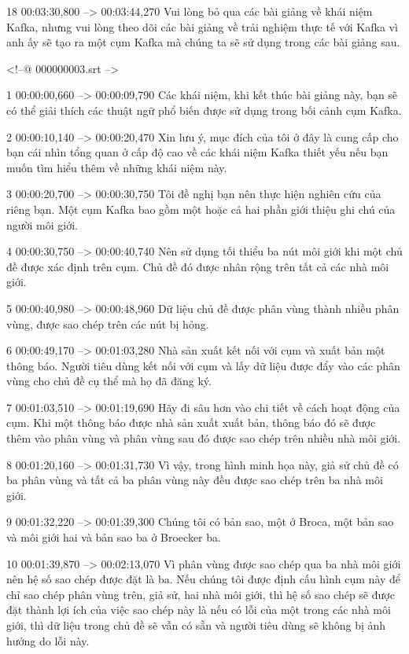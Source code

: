 18
00:03:30,800 --> 00:03:44,270
Vui lòng bỏ qua các bài giảng về khái niệm Kafka, nhưng vui lòng theo dõi các bài giảng về trải nghiệm thực tế với Kafka vì anh ấy sẽ tạo ra một cụm Kafka mà chúng ta sẽ sử dụng trong các bài giảng sau.

<!--@ 000000003.srt -->

1
00:00:00,660 --> 00:00:09,790
Các khái niệm, khi kết thúc bài giảng này, bạn sẽ có thể giải thích các thuật ngữ phổ biến được sử dụng trong bối cảnh cụm Kafka.

2
00:00:10,140 --> 00:00:20,470
Xin lưu ý, mục đích của tôi ở đây là cung cấp cho bạn cái nhìn tổng quan ở cấp độ cao về các khái niệm Kafka thiết yếu nếu bạn muốn tìm hiểu thêm về những khái niệm này.

3
00:00:20,700 --> 00:00:30,750
Tôi đề nghị bạn nên thực hiện nghiên cứu của riêng bạn.  Một cụm Kafka bao gồm một hoặc cả hai phần giới thiệu ghi chú của người môi giới.

4
00:00:30,750 --> 00:00:40,740
Nên sử dụng tối thiểu ba nút môi giới khi một chủ đề được xác định trên cụm.  Chủ đề đó được nhân rộng trên tất cả các nhà môi giới.

5
00:00:40,980 --> 00:00:48,960
Dữ liệu chủ đề được phân vùng thành nhiều phân vùng, được sao chép trên các nút bị hỏng.

6
00:00:49,170 --> 00:01:03,280
Nhà sản xuất kết nối với cụm và xuất bản một thông báo.  Người tiêu dùng kết nối với cụm và lấy dữ liệu được đẩy vào các phân vùng cho chủ đề cụ thể mà họ đã đăng ký.

7
00:01:03,510 --> 00:01:19,690
Hãy đi sâu hơn vào chi tiết về cách hoạt động của cụm.  Khi một thông báo được nhà sản xuất xuất bản, thông báo đó sẽ được thêm vào phân vùng và phân vùng sau đó được sao chép trên nhiều nhà môi giới.

8
00:01:20,160 --> 00:01:31,730
Vì vậy, trong hình minh họa này, giả sử chủ đề có ba phân vùng và tất cả ba phân vùng này đều được sao chép trên ba nhà môi giới.

9
00:01:32,220 --> 00:01:39,300
Chúng tôi có bản sao, một ở Broca, một bản sao và môi giới hai và bản sao ba ở Broecker ba.

10
00:01:39,870 --> 00:02:13,070
Vì phân vùng được sao chép qua ba nhà môi giới nên hệ số sao chép được đặt là ba.  Nếu chúng tôi được định cấu hình cụm này để chỉ sao chép phân vùng trên, giả sử, hai nhà môi giới, thì hệ số sao chép sẽ được đặt thành lợi ích của việc sao chép này là nếu có lỗi của một trong các nhà môi giới, thì dữ liệu trong  chủ đề sẽ vẫn có sẵn và người tiêu dùng sẽ không bị ảnh hưởng do lỗi này.


